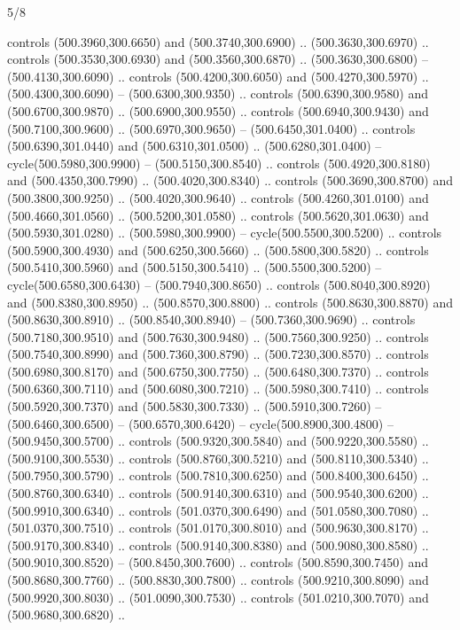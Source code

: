 \begin{flagdescription}{5/8}
\begin{scope}[xshift=0.5\flaglength,yshift=0.5\flagwidth,scale=\flagwidth/475.63]
\begin{scope}[y=0.8pt, x=0.8pt, yscale=-1, xscale=1,shift={(-450,-300)}]
\begin{scope}[cm={{1.0,0.0,0.0,1.0,(-0.0002,0.12556)}},cm={{1.0,0.0,0.0,1.0,(0.00179,0.0)}}]
\begin{scope}[cm={{1.11592,0.0,0.0,1.11592,(-106.89933,-41.77764)}}]
\begin{scope}[draw=black,fill=cfff]
\begin{scope}[fill=black]
  controls (500.3960,300.6650) and (500.3740,300.6900) .. (500.3630,300.6970) ..
  controls (500.3530,300.6930) and (500.3560,300.6870) .. (500.3630,300.6800) --
  (500.4130,300.6090) .. controls (500.4200,300.6050) and (500.4270,300.5970) ..
  (500.4300,300.6090) -- (500.6300,300.9350) .. controls (500.6390,300.9580) and
  (500.6700,300.9870) .. (500.6900,300.9550) .. controls (500.6940,300.9430) and
  (500.7100,300.9600) .. (500.6970,300.9650) -- (500.6450,301.0400) .. controls
  (500.6390,301.0440) and (500.6310,301.0500) .. (500.6280,301.0400) --
  cycle(500.5980,300.9900) -- (500.5150,300.8540) .. controls
  (500.4920,300.8180) and (500.4350,300.7990) .. (500.4020,300.8340) .. controls
  (500.3690,300.8700) and (500.3800,300.9250) .. (500.4020,300.9640) .. controls
  (500.4260,301.0100) and (500.4660,301.0560) .. (500.5200,301.0580) .. controls
  (500.5620,301.0630) and (500.5930,301.0280) .. (500.5980,300.9900) --
  cycle(500.5500,300.5200) .. controls (500.5900,300.4930) and
  (500.6250,300.5660) .. (500.5800,300.5820) .. controls (500.5410,300.5960) and
  (500.5150,300.5410) .. (500.5500,300.5200) -- cycle(500.6580,300.6430) --
  (500.7940,300.8650) .. controls (500.8040,300.8920) and (500.8380,300.8950) ..
  (500.8570,300.8800) .. controls (500.8630,300.8870) and (500.8630,300.8910) ..
  (500.8540,300.8940) -- (500.7360,300.9690) .. controls (500.7180,300.9510) and
  (500.7630,300.9480) .. (500.7560,300.9250) .. controls (500.7540,300.8990) and
  (500.7360,300.8790) .. (500.7230,300.8570) .. controls (500.6980,300.8170) and
  (500.6750,300.7750) .. (500.6480,300.7370) .. controls (500.6360,300.7110) and
  (500.6080,300.7210) .. (500.5980,300.7410) .. controls (500.5920,300.7370) and
  (500.5830,300.7330) .. (500.5910,300.7260) -- (500.6460,300.6500) --
  (500.6570,300.6420) -- cycle(500.8900,300.4800) -- (500.9450,300.5700) ..
  controls (500.9320,300.5840) and (500.9220,300.5580) .. (500.9100,300.5530) ..
  controls (500.8760,300.5210) and (500.8110,300.5340) .. (500.7950,300.5790) ..
  controls (500.7810,300.6250) and (500.8400,300.6450) .. (500.8760,300.6340) ..
  controls (500.9140,300.6310) and (500.9540,300.6200) .. (500.9910,300.6340) ..
  controls (501.0370,300.6490) and (501.0580,300.7080) .. (501.0370,300.7510) ..
  controls (501.0170,300.8010) and (500.9630,300.8170) .. (500.9170,300.8340) ..
  controls (500.9140,300.8380) and (500.9080,300.8580) .. (500.9010,300.8520) --
  (500.8450,300.7600) .. controls (500.8590,300.7450) and (500.8680,300.7760) ..
  (500.8830,300.7800) .. controls (500.9210,300.8090) and (500.9920,300.8030) ..
  (501.0090,300.7530) .. controls (501.0210,300.7070) and (500.9680,300.6820) ..

\end{scope}
\end{scope}
\end{scope}
\end{scope}
\end{scope}
\end{scope}
\end{flagdescription}
